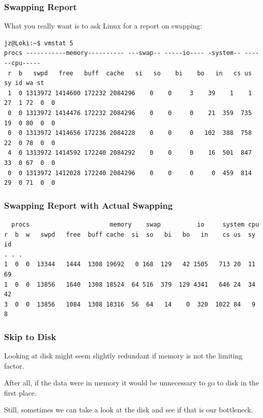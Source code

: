 \begin{frame}[fragile]
\frametitle{Swapping Report}


\begin{changemargin}{1cm}
What you really want is to ask Linux for a report on swapping:
\end{changemargin}
\vspace*{-2em}
{\scriptsize
\begin{verbatim}
jz@Loki:~$ vmstat 5
procs -----------memory---------- ---swap-- -----io---- -system-- ------cpu-----
 r  b   swpd   free   buff  cache   si   so    bi    bo   in   cs us sy id wa st
 1  0 1313972 1414600 172232 2084296    0    0     3    39    1    1 27  1 72  0  0
 0  0 1313972 1414476 172232 2084296    0    0     0    21  359  735 19  0 80  0  0
 0  0 1313972 1414656 172236 2084228    0    0     0   102  388  758 22  0 78  0  0
 4  0 1313972 1414592 172240 2084292    0    0     0    16  501  847 33  0 67  0  0
 0  0 1313972 1412028 172240 2084296    0    0     0     0  459  814 29  0 71  0  0
\end{verbatim}
}

\end{frame}



\begin{frame}[fragile]
\frametitle{Swapping Report with Actual Swapping}

{\small
\begin{verbatim}
  procs                      memory    swap          io     system cpu
r  b  w   swpd   free  buff cache  si  so   bi   bo   in    cs us  sy  id
. . .
1  0  0  13344   1444  1308 19692   0 168  129   42 1505   713 20  11  69
1  0  0  13856   1640  1308 18524  64 516  379  129 4341   646 24  34  42
3  0  0  13856   1084  1308 18316  56  64   14    0  320  1022 84   9   8
\end{verbatim}
}

\end{frame}



\begin{frame}
\frametitle{Skip to Disk}


\begin{changemargin}{1cm}
Looking at disk might seem slightly redundant if memory is not the limiting factor. 

After all, if the data were in memory it would be unnecessary to go to disk in the first place. 

Still, sometimes we can take a look at the disk and see if that is our bottleneck.
\end{changemargin}

\end{frame}




